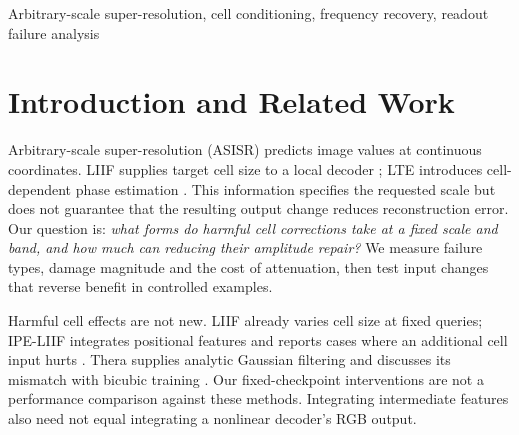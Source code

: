 \begin{abstract}
Relative to zero cell, native target-cell conditioning in arbitrary-scale
super-resolution improves average quality but need not improve every image
or frequency band. We diagnose
this discrepancy through fixed-checkpoint corrections, separating amplitude
overshoot from wrong-direction changes using an exact squared-error identity.
A prospective replication on 32 natural images, LTE and an LTE-derived experimental variant under two
training seeds finds harmful corrections against both zero and nonzero cell
references. Relative to zero cell, native conditioning improves mean PSNR
in all four model--scale groups, yet uniform half-correction increases mean
RGB MSE by 0.26--7.55\%. A complete retrospective attenuation analysis
finds that even the HR-informed best uniform weight reduces this error
by at most .0011\% against zero and .086\% against the nonzero reference.
Nonzero references reveal additional failures and
change which images are labelled harmful: failure is a property of a specified
correction, not an intrinsic image label. Controlled high-frequency input
paths and equal-power phase changes further produce opposite gains at fixed
scale. The results quantify the limited repair capacity of uniform attenuation
and distinguish band damage from image-level and aggregate costs.
\end{abstract}
\begin{keywords}
Arbitrary-scale super-resolution, cell conditioning, frequency recovery,
readout failure analysis
\end{keywords}

\section{Introduction and Related Work}
\label{sec:intro}
Arbitrary-scale super-resolution (ASISR) predicts image values at continuous
coordinates. LIIF supplies target cell size to a local decoder
\cite{chen2021liif}; LTE introduces cell-dependent phase estimation
\cite{lee2022lte}. This information specifies the requested scale but does
not guarantee that the resulting output change reduces reconstruction
error. Our question is: \emph{what forms do harmful cell corrections take at a
fixed scale and band, and how much can reducing their amplitude repair?}
We measure failure types, damage magnitude and the cost of attenuation,
then test input changes that reverse benefit in controlled examples.

Harmful cell effects are not new. LIIF already varies cell size at fixed
queries; IPE-LIIF integrates positional features and reports cases where
an additional cell input hurts \cite{liu2021ipe}. Thera supplies analytic
Gaussian filtering and discusses its mismatch with bicubic training
\cite{becker2025thera}. Our fixed-checkpoint interventions are not a
performance comparison against these methods. Integrating intermediate
features also need not equal integrating a nonlinear decoder's RGB output.

